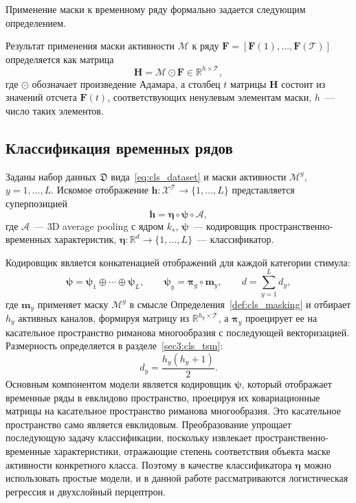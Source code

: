Применение маски к временному ряду формально задается следующим определением.

\begin{definition}\label{def:cls_masking}
Результат применения маски активности $\mathcal{M}$ к ряду $\mathbf{F} = [\mathbf{F}(1), \ldots, \mathbf{F}(\mathcal{T})]$ определяется как матрица
\begin{equation*}
\mathbf{H} = \mathcal{M} \odot \mathbf{F} \in \mathbb{R}^{h \times \mathcal{T}},
\end{equation*}
где $\odot$ обозначает произведение Адамара, а столбец $t$ матрицы $\mathbf{H}$ состоит из значений отсчета $\mathbf{F}(t)$, соответствующих ненулевым элементам маски, $h$~--- число таких элементов.
\end{definition}

\subsection{Классификация временных рядов}\label{sec3:cls_clf}
Заданы набор данных $\mathfrak{D}$ вида~\eqref{eq:cls_dataset} и маски активности $\mathcal{M}^{y}$, $y = 1, \ldots, L$. Искомое отображение $\mathbf{h}: \mathcal{X}^{\mathcal{T}} \to \{1,\ldots,L\}$ представляется суперпозицией
\begin{equation}\label{eq:cls_model}
\mathbf{h} = \boldsymbol{\eta} \circ \boldsymbol{\psi} \circ \mathcal{A},
\end{equation}
где $\mathcal{A}$~--- 3D average pooling с ядром $k_s$, $\boldsymbol{\psi}$~--- кодировщик пространственно-временных характеристик, $\boldsymbol{\eta}: \mathbb{R}^{d} \to \{1,\ldots,L\}$~--- классификатор.

Кодировщик является конкатенацией отображений для каждой категории стимула:
\begin{equation}\label{eq:cls_psi}
\boldsymbol{\psi} = \boldsymbol{\psi}_1 \oplus \cdots \oplus \boldsymbol{\psi}_L, \qquad \boldsymbol{\psi}_y = \boldsymbol{\pi}_y \circ \mathbf{m}_y, \qquad d = \sum_{y=1}^{L} d_y,
\end{equation}
где $\mathbf{m}_y$ применяет маску $\mathcal{M}^{y}$ в смысле Определения~\ref{def:cls_masking} и отбирает $h_y$ активных каналов, формируя матрицу из $\mathbb{R}^{h_y \times \mathcal{T}}$, а $\boldsymbol{\pi}_y$ проецирует ее на касательное пространство риманова многообразия с последующей векторизацией. Размерность определяется в разделе~\ref{sec3:cls_tsm}:
\begin{equation*}d_y = \frac{h_y(h_y+1)}{2}.
\end{equation*}
Основным компонентом модели является кодировщик $\boldsymbol{\psi}$, который отображает временные ряды в евклидово пространство, проецируя их ковариационные матрицы на касательное пространство риманова многообразия. Это касательное пространство само является евклидовым. Преобразование упрощает последующую задачу классификации, поскольку извлекает пространственно-временные характеристики, отражающие степень соответствия объекта маске активности конкретного класса. Поэтому в качестве классификатора $\boldsymbol{\eta}$ можно использовать простые модели, и в данной работе рассматриваются логистическая регрессия и двухслойный перцептрон.

